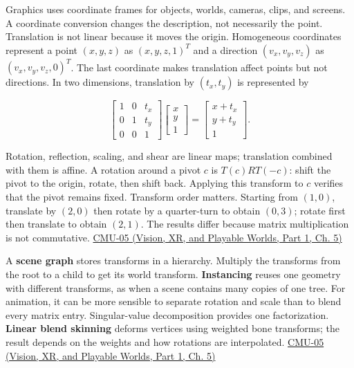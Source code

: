 \hypertarget{03-visual-computing-i-ch001-coordinate-frames-and-affine-transforms}{}

Graphics uses coordinate frames for objects, worlds, cameras, clips, and screens. A coordinate conversion changes the description, not necessarily the point. Translation is not linear because it moves the origin. Homogeneous coordinates represent a point \((x,y,z)\) as \((x,y,z,1)^T\) and a direction \((v_x,v_y,v_z)\) as \((v_x,v_y,v_z,0)^T\). The last coordinate makes translation affect points but not directions. In two dimensions, translation by \((t_x,t_y)\) is represented by

\[
\begin{bmatrix}1&0&t_x\\0&1&t_y\\0&0&1\end{bmatrix}
\begin{bmatrix}x\\y\\1\end{bmatrix}
=\begin{bmatrix}x+t_x\\y+t_y\\1\end{bmatrix}.
\]

Rotation, reflection, scaling, and shear are linear maps; translation combined with them is affine. A rotation around a pivot \(c\) is \(T(c)RT(-c)\): shift the pivot to the origin, rotate, then shift back. Applying this transform to \(c\) verifies that the pivot remains fixed. Transform order matters. Starting from \((1,0)\), translate by \((2,0)\) then rotate by a quarter-turn to obtain \((0,3)\); rotate first then translate to obtain \((2,1)\). The results differ because matrix multiplication is not commutative. \href{../07-Vision-XR-and-Playable-Worlds-P01/main.pdf\#04-visual-computing-ii-ch036-cmu-05---spatial-transformations}{CMU-05 (Vision, XR, and Playable Worlds, Part 1, Ch. 5)}

A \textbf{scene graph} stores transforms in a hierarchy. Multiply the transforms from the root to a child to get its world transform. \textbf{Instancing} reuses one geometry with different transforms, as when a scene contains many copies of one tree. For animation, it can be more sensible to separate rotation and scale than to blend every matrix entry. Singular-value decomposition provides one factorization. \textbf{Linear blend skinning} deforms vertices using weighted bone transforms; the result depends on the weights and how rotations are interpolated. \href{../07-Vision-XR-and-Playable-Worlds-P01/main.pdf\#04-visual-computing-ii-ch036-cmu-05---spatial-transformations}{CMU-05 (Vision, XR, and Playable Worlds, Part 1, Ch. 5)}

